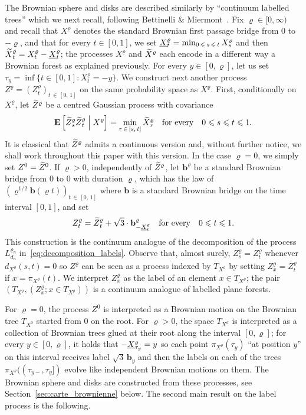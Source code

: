 \documentclass[10pt]{amsart}
\theoremstyle{definition}\newtheorem{defi}[theo]{Definition}\newtheorem{rema}[theo]{Remark}\newtheorem{exam}[theo]{Example}\newtheorem{exem}[theo]{Example}\newtheorem{nota}[theo]{Notation}
\newcommand{\ensembles}[1]{\mathbf{#1}}
\newcommand{\E}{\ensembles{E}}
\newcommand{\Esc}[2]{\E\left[#1 \;\middle|\; #2\right]}
\newcommand{\1}{\ensembles{1}}
\newcommand{\tildep}[1]{\widetilde{#1}\vphantom{#1}}
\newcommand{\underlinep}[1]{\underline{#1}\vphantom{#1}}
\newcommand{\bb}{\mathbf{b}}
\renewcommand{\le}{\leqslant}
\newcommand{\CRT}{T}
\newcommand{\dCRT}{d}
\newcommand{\Lfn}{L_{d_n}^{\varrho_n}}
\newcommand{\tX}{\tildep{X}^{\varrho}}
\providecommand{\?}{}
\begin{document}
The Brownian sphere and disks are described similarly by ``continuum labelled trees'' which we next recall, following Bettinelli \& Miermont~\cite{BM17}. Fix $\varrho \in [0, \infty)$ and recall that $X^\varrho$ denotes the standard Brownian first passage bridge from $0$ to $-\varrho$, and that for every $t \in [0,1]$, we set $\underlinep{X}^\varrho_t = \min_{0\,\le\,s\,\le\,t} X^\varrho_s$ and then $\tX_t = X^\varrho_t-\underlinep{X}^\varrho_t$; the processes $X^\varrho$ and $\tX$ each encode in a different way a Brownian forest as explained previously. For every $y \in [0,\varrho]$, let us set $\tau_y = \inf\{t \in [0,1] : X^\varrho_t = -y\}$. We construct next another process $Z^\varrho = (Z^\varrho_t)_{t\,\in\,[0,\,1]}$ on the same probability space as $X^\varrho$. First, conditionally on $X^\varrho$, let $\tildep{Z}^\varrho$ be a centred Gaussian process with covariance
\[
\Esc{\tildep{Z}^\varrho_s \tildep{Z}^\varrho_t}{X^\varrho} = \min_{r\,\in\,[s,\,t]} \tX_r
\quad\text{for every}\quad 0 \le s \le t \le 1.
\]
It is classical that $\tildep{Z}^\varrho$ admits a continuous version and, without further notice, we shall work throughout this paper with this version. In the case $\varrho = 0$, we simply set $Z^0 = \tildep{Z}^0$. If $\varrho > 0$, independently of $\tildep{Z}^\varrho$, let $\bb^\varrho$ be a standard Brownian bridge from $0$ to $0$ with duration $\varrho$, which has the law of $(\varrho^{1/2} \bb(\varrho t))_{t\,\in\,[0,\,1]}$ where $\bb$ is a standard Brownian bridge on the time interval $[0,1]$, and set
\[
Z^\varrho_t = \tildep{Z}^\varrho_t + \sqrt{3} \cdot \bb^\varrho_{- \underlinep{X}^\varrho_t}
\quad\text{for every}\quad 0 \le t \le 1.
\]
This construction is the continuum analogue of the decomposition of the process $\Lfn$ in~\eqref{eq:decomposition_labels}. Observe that, almost surely, $Z^\varrho_s = Z^\varrho_t$ whenever $\dCRT_{X^\varrho}(s, t) = 0$ so $Z^\varrho$ can be seen as a process indexed by $\CRT_{X^\varrho}$ by setting $Z^\varrho_x = Z^\varrho_t$ if $x = \pi_{X^\varrho}(t)$. We interpret $Z^\varrho_{x}$ as the label of an element $x \in \CRT_{X^\varrho}$; the pair $(\CRT_{X^\varrho}, (Z^\varrho_x; x \in \CRT_{X^\varrho}))$ is a continuum analogue of labelled plane forests.

For $\varrho = 0$, the process $Z^0$ is interpreted as a Brownian motion on the Brownian tree $\CRT_{X^0}$ started from $0$ on the root. For $\varrho > 0$, the space $\CRT_{X^\varrho}$ is interpreted as a collection of Brownian trees glued at their root along the interval $[0,\varrho]$; for every $y \in [0,\varrho]$, it holds that $- \underlinep{X}^\varrho_{\tau_y} = y$ so each point $\pi_{X^\varrho}(\tau_y)$ ``at position $y$'' on this interval receives label $\sqrt{3} \, \bb_{y}$ and then the labels on each of the trees $\pi_{X^\varrho}((\tau_{y-}, \tau_y])$ evolve like independent Brownian motions on them. The Brownian sphere and disks are constructed from these processes, see Section~\ref{sec:carte_brownienne} below. The second main result on the label process is the following.
\end{document}
